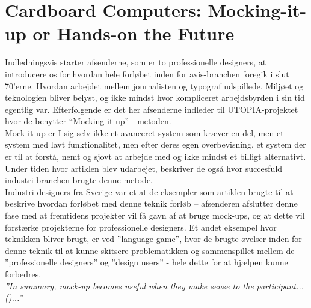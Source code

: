 \documentclass[12pt]{article}   %
\begin{document}
\section{Cardboard Computers: Mocking-it-up or Hands-on the Future}
Indledningsvis starter afsenderne, som er to professionelle designers, at introducere os for hvordan hele forløbet inden for avis-branchen foregik i slut 70'erne. Hvordan arbejdet mellem journalisten og typograf udspillede. Miljøet og teknologien bliver belyst, og ikke mindst hvor kompliceret arbejdsbyrden i sin tid egentlig var. Efterfølgende  er det her afsenderne indleder til  UTOPIA-projektet hvor de benytter “Mocking-it-up” -  metoden.  \\ 
Mock it up er I sig selv ikke et avanceret system som kræver en del, men et system med lavt funktionalitet, men efter deres egen overbevisning, et system der er til at forstå, nemt og sjovt at arbejde med og ikke mindst et billigt alternativt. Under tiden hvor artiklen blev udarbejet, beskriver de også hvor succesfuld industri-branchen brugte denne metode. \\
Industri designers fra Sverige var et at de eksempler som artiklen brugte til at beskrive hvordan forløbet med denne teknik forløb – afsenderen afslutter denne fase med at fremtidens projekter vil få gavn af at bruge mock-ups, og at dette vil forstærke projekterne for professionelle designers. Et andet eksempel hvor teknikken bliver brugt, er ved ”language game”,  hvor de brugte øvelser inden for denne teknik til at kunne skitsere problematikken og sammenspillet mellem de ”professionelle designers” og ”design users”  - hele dette for at hjælpen kunne forbedres. \\

\noindent \emph{”In summary, mock-up becomes useful when they make sense to the participant...()...”}\\
\end{document}
